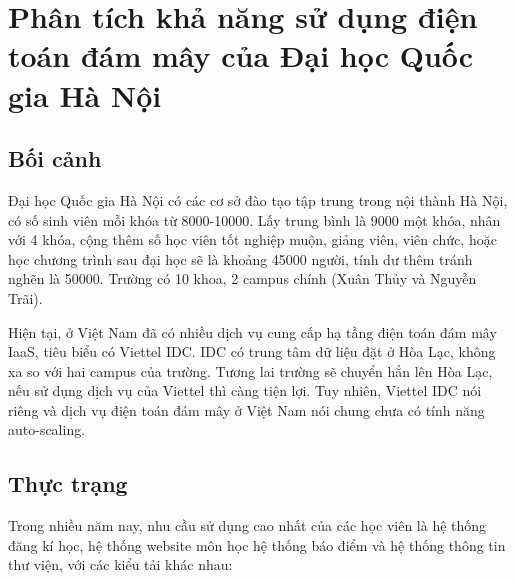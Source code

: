 \documentclass{article}
\begin{document}
\section{Phân tích khả năng sử dụng điện toán đám mây của Đại học Quốc gia Hà Nội}

\subsection{Bối cảnh}
Đại học Quốc gia Hà Nội có các cơ sở đào tạo tập trung trong nội thành Hà Nội,
có số sinh viên mỗi khóa từ 8000-10000. Lấy trung bình là 9000 một khóa, nhân
với 4 khóa, cộng thêm số học viên tốt nghiệp muộn, giảng viên, viên chức, hoặc
học chương trình sau đại học sẽ là khoảng 45000 người, tính dư thêm tránh nghẽn
là 50000. Trường có 10 khoa, 2 campus chính (Xuân Thủy và Nguyễn Trãi).

Hiện tại, ở Việt Nam đã có nhiều dịch vụ cung cấp hạ tầng điện toán đám mây
IaaS, tiêu biểu có Viettel IDC. IDC có trung tâm dữ liệu đặt ở Hòa Lạc, không xa
so với hai campus của trường. Tương lai trường sẽ chuyển hẳn lên Hòa Lạc, nếu sử
dụng dịch vụ của Viettel thì càng tiện lợi. Tuy nhiên, Viettel IDC nói riêng và
dịch vụ điện toán đám mây ở Việt Nam nói chung chưa có tính năng auto-scaling.

\subsection{Thực trạng}
Trong nhiều năm nay, nhu cầu sử dụng cao nhất của các học viên là hệ thống đăng
kí học, hệ thống website môn học hệ thống báo điểm và hệ thống thông tin thư
viện, với các kiểu tải khác nhau:
\end{document}
